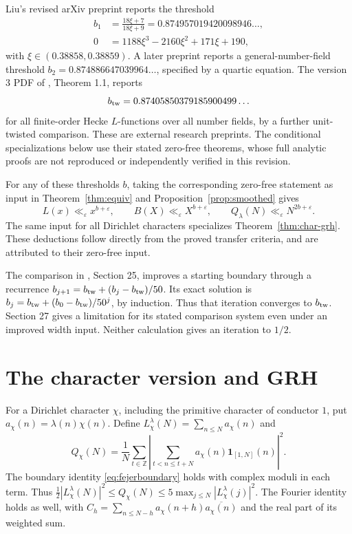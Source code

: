 \documentclass[11pt]{amsart}
\theoremstyle{definition}
\theoremstyle{remark}
\newcommand{\one}{\mathbf 1}
\numberwithin{equation}{section}
\begin{document}
Liu's revised arXiv preprint \cite{liu1} reports the threshold
\begin{align*}
 b_1&=\frac{18\xi+7}{18\xi+9}=0.874957019420098946\ldots,\\
 0&=1188\xi^3-2160\xi^2+171\xi+190,
\end{align*}
with \(\xi\in(0.38858,0.38859)\). A later preprint \cite{liu2} reports a general-number-field threshold \(b_2=0.874886647039964\ldots\), specified by a quartic equation. The version 3 PDF of \cite{liu3}, Theorem 1.1, reports
\[
 b_{\rm tw}=0.87405850379185900499\ldots
\]
for all finite-order Hecke \(L\)-functions over all number fields, by a further unit-twisted comparison. These are external research preprints. The conditional specializations below use their stated zero-free theorems, whose full analytic proofs are not reproduced or independently verified in this revision.

For any of these thresholds \(b\), taking the corresponding zero-free statement as input in Theorem~\ref{thm:equiv} and Proposition~\ref{prop:smoothed} gives
\[
 L(x)\ll_\varepsilon x^{b+\varepsilon},\qquad
 B(X)\ll_\varepsilon X^{b+\varepsilon},\qquad
 Q_\lambda(N)\ll_\varepsilon N^{2b+\varepsilon}.
\]
The same input for all Dirichlet characters specializes Theorem~\ref{thm:char-grh}. These deductions follow directly from the proved transfer criteria, and are attributed to their zero-free input.

The comparison in \cite{liu3}, Section 25, improves a starting boundary through a recurrence \(b_{j+1}=b_{\rm tw}+(b_j-b_{\rm tw})/50\). Its exact solution is \(b_j=b_{\rm tw}+(b_0-b_{\rm tw})/50^j\), by induction. Thus that iteration converges to \(b_{\rm tw}\). Section 27 gives a limitation for its stated comparison system even under an improved width input. Neither calculation gives an iteration to \(1/2\).



\section{The character version and GRH}\label{sec:characters}

For a Dirichlet character \(\chi\), including the primitive character of conductor \(1\), put \(a_\chi(n)=\lambda(n)\chi(n)\). Define \(L_\chi^\lambda(N)=\sum_{n\le N}a_\chi(n)\) and
\[
 Q_\chi(N)=\frac1N\sum_{t\in\mathbb Z}
  \left|\sum_{t<n\le t+N}a_\chi(n)\one_{[1,N]}(n)\right|^2 .
\]
The boundary identity \eqref{eq:fejerboundary} holds with complex moduli in each term. Thus
\(\tfrac12|L_\chi^\lambda(N)|^2\le Q_\chi(N)
 \le5\max_{j\le N}|L_\chi^\lambda(j)|^2\).
The Fourier identity holds as well, with
\(C_h=\sum_{n\le N-h}a_\chi(n+h)\overline{a_\chi(n)}\)
and the real part of its weighted sum.
\end{document}
